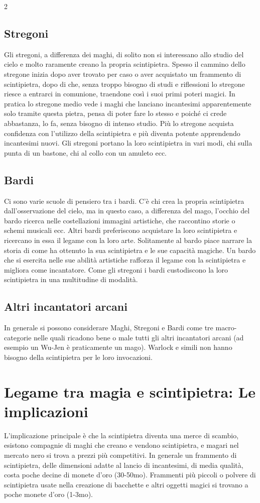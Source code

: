 \documentclass[10pt, a4paper]{report}
\begin{document}
\begin{multicols}{2}
\subsection*{Stregoni}
Gli stregoni, a differenza dei maghi, di solito non si interessano allo studio del cielo e molto raramente creano la propria scintipietra. Spesso il cammino dello stregone inizia dopo aver trovato per caso o aver acquistato un frammento di scintipietra, dopo di che, senza troppo bisogno di studi e riflessioni lo stregone riesce a entrarci in comunione, traendone così i suoi primi poteri magici. In pratica lo stregone medio vede i maghi che lanciano incantesimi apparentemente solo tramite questa pietra, pensa di poter fare lo stesso e poiché ci crede abbastanza, lo fa, senza bisogno di intenso studio. Più lo stregone acquista confidenza con l'utilizzo della scintipietra e più diventa potente apprendendo incantesimi nuovi. Gli stregoni portano la loro scintipietra in vari modi, chi sulla punta di un bastone, chi al collo con un amuleto ecc. 


\subsection*{Bardi}
Ci sono varie scuole di pensiero tra i bardi. C'è chi crea la propria scintipietra dall'osservazione del cielo, ma in questo caso, a differenza del mago, l'occhio del bardo ricerca nelle costellazioni immagini artistiche, che raccontino storie o schemi musicali ecc. Altri bardi preferiscono acquistare la loro scintipietra e ricercano in essa il legame con la loro arte. Solitamente al bardo piace narrare la storia di come ha ottenuto la sua scintipietra e le sue capacità magiche. Un bardo che si esercita nelle sue abilità artistiche rafforza il legame con la scintipietra e migliora come incantatore.
Come gli stregoni i bardi custodiscono la loro scintipietra in una multitudine di modalità.  

\subsection*{Altri incantatori arcani}
In generale si possono considerare Maghi, Stregoni e Bardi come tre macro-categorie nelle quali ricadono bene o male tutti gli altri incantatori arcani (ad esempio un Wu-Jen è praticamente un mago). Warlock e simili non hanno bisogno della scintipietra per le loro invocazioni.

\section{Legame tra magia e scintipietra: Le implicazioni}
L'implicazione principale è che la scintipietra diventa una merce di scambio, esistono compagnie di maghi che creano e vendono scintipietra, e magari nel mercato nero si trova a prezzi più competitivi. In generale un frammento di scintipietra, delle dimensioni adatte al lancio di incantesimi, di media qualità, costa poche decine di monete d'oro (30-50mo). Frammenti più piccoli o polvere di scintipietra usate nella creazione di bacchette e altri oggetti magici si trovano a poche monete d'oro (1-3mo).


\end{multicols}
\end{document}
